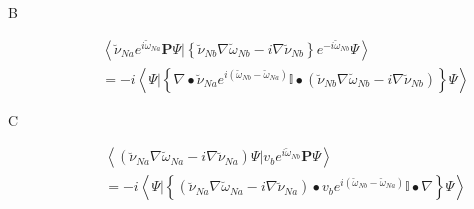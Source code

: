\documentclass[aps,preprint]{revtex4}%
\begin{document}
\begin{description}
\item[B]
\begin{align}
&  \left\langle \breve{\nu}_{Na}e^{i\breve{\omega}_{Na}}\mathbf{P}%
\Psi|\left\{  \breve{\nu}_{Nb}\nabla\breve{\omega}_{Nb}-i\nabla\breve{\nu
}_{Nb}\right\}  e^{-i\breve{\omega}_{Nb}}\Psi\right\rangle \nonumber\\
&  =-i\left\langle \Psi|\left\{  \nabla\bullet\breve{\nu}_{Na}e^{i\left(
\breve{\omega}_{Nb}-\breve{\omega}_{Na}\right)  }\mathbb{I}\bullet\left(
\breve{\nu}_{Nb}\nabla\breve{\omega}_{Nb}-i\nabla\breve{\nu}_{Nb}\right)
\right\}  \Psi\right\rangle
\end{align}


\item[C]
\begin{align}
&  \left\langle \left(  \breve{\nu}_{Na}\nabla\breve{\omega}_{Na}%
-i\nabla\breve{\nu}_{Na}\right)  \Psi|v_{b}e^{i\breve{\omega}_{Nb}}%
\mathbf{P}\Psi\right\rangle \nonumber\\
&  =-i\left\langle \Psi|\left\{  \left(  \breve{\nu}_{Na}\nabla\breve{\omega
}_{Na}-i\nabla\breve{\nu}_{Na}\right)  \bullet v_{b}e^{i\left(  \breve{\omega
}_{Nb}-\breve{\omega}_{Na}\right)  }\mathbb{I}\bullet\nabla\right\}
\Psi\right\rangle
\end{align}



\end{description}
\end{document}
